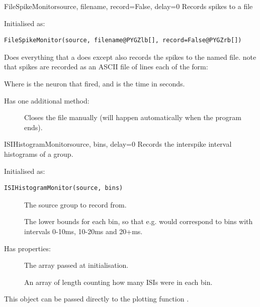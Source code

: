 \documentclass[letterpaper,10pt,english]{manual}
\begin{document}
\hypertarget{brian.FileSpikeMonitor}{}\begin{classdesc}{FileSpikeMonitor}{source, filename, record=False, delay=0}
Records spikes to a file

Initialised as:

\begin{Verbatim}[commandchars=@\[\]]
FileSpikeMonitor(source, filename@PYGZlb[], record=False@PYGZrb[])
\end{Verbatim}

Does everything that a \hyperlink{brian.SpikeMonitor}{} does except also records
the spikes to the named file. note that spikes are recorded
as an ASCII file of lines each of the form:
\begin{quote}

\end{quote}

Where  is the neuron that fired, and  is the time in seconds.

Has one additional method:
\begin{description}
\item[]
Closes the file manually (will happen automatically when
the program ends).

\end{description}
\end{classdesc}

\hypertarget{brian.ISIHistogramMonitor}{}\begin{classdesc}{ISIHistogramMonitor}{source, bins, delay=0}
Records the interspike interval histograms of a group.

Initialised as:

\begin{Verbatim}[commandchars=@\[\]]
ISIHistogramMonitor(source, bins)
\end{Verbatim}
\begin{description}
\item[]
The source group to record from.

\item[]
The lower bounds for each bin, so that e.g.
 would correspond to
bins with intervals 0-10ms, 10-20ms and
20+ms.

\end{description}

Has properties:
\begin{description}
\item[]
The  array passed at initialisation.

\item[]
An array of length  counting how many ISIs
were in each bin.

\end{description}

This object can be passed directly to the plotting function
\hyperlink{brian.hist_plot}{}.
\end{classdesc}
\end{document}
